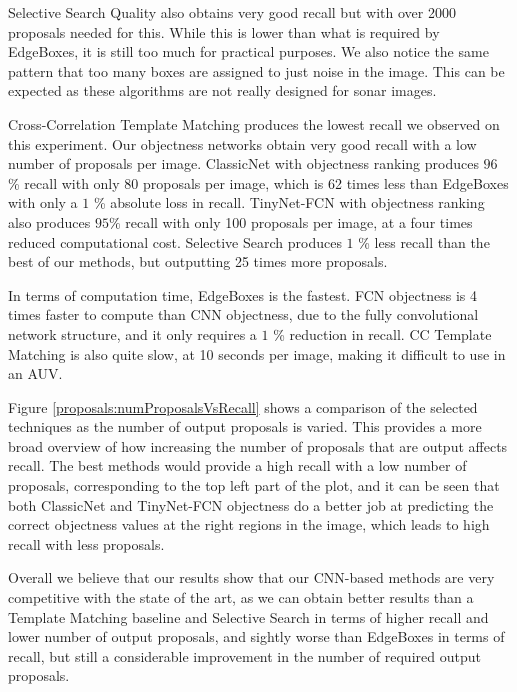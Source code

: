 Selective Search Quality also obtains very good recall but with over 2000 proposals needed for this. While this is lower than what is required by EdgeBoxes, it is still too much for practical purposes. We also notice the same pattern that too many boxes are assigned to just noise in the image. This can be expected as these algorithms are not really designed for sonar images.

Cross-Correlation Template Matching produces the lowest recall we observed on this experiment. Our objectness networks obtain very good recall with a low number of proposals per image. ClassicNet with objectness ranking produces $96$ \% recall with only 80 proposals per image, which is 62 times less than EdgeBoxes with only a $1$ \% absolute loss in recall. TinyNet-FCN with objectness ranking also produces $95 \%$ recall with only 100 proposals per image, at a four times reduced computational cost. Selective Search produces $1$ \% less recall than the best of our methods, but outputting 25 times more proposals.

In terms of computation time, EdgeBoxes is the fastest. FCN objectness is 4 times faster to compute than CNN objectness, due to the fully convolutional network structure, and it only requires a $1$ \% reduction in recall. CC Template Matching is also quite slow, at 10 seconds per image, making it difficult to use in an AUV.

Figure \ref{proposals:numProposalsVsRecall} shows a comparison of the selected techniques as the number of output proposals is varied. This provides a more broad overview of how increasing the number of proposals that are output affects recall. The best methods would provide a high recall with a low number of proposals, corresponding to the top left part of the plot, and it can be seen that both ClassicNet and TinyNet-FCN objectness do a better job at predicting the correct objectness values at the right regions in the image, which leads to high recall with less proposals.

Overall we believe that our results show that our CNN-based methods are very competitive with the state of the art, as we can obtain better results than a Template Matching baseline and Selective Search in terms of higher recall and lower number of output proposals, and sightly worse than EdgeBoxes in terms of recall, but still a considerable improvement in the number of required output proposals.


